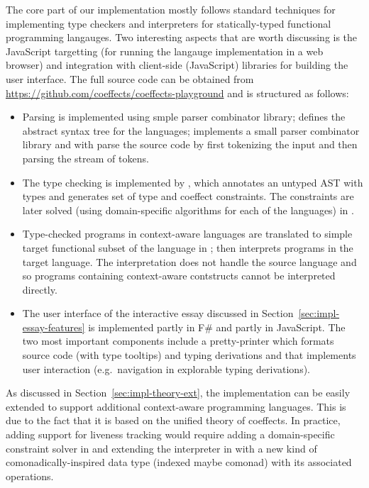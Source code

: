 The core part of our implementation mostly follows standard techniques for implementing type
checkers and interpreters for statically-typed functional programming langauges. Two interesting
aspects that are worth discussing is the JavaScript targetting (for running the langauge
implementation in a web browser) and integration with client-side (JavaScript) libraries for
building the user interface. The full source code can be obtained from
\url{https://github.com/coeffects/coeffects-playground} and is structured as follows:
%
\begin{itemize}
\item Parsing is implemented using smple parser combinator library;  defines the
  abstract syntax tree for the languages;  implements a small parser combinator
  library and  with  parse the source code by first tokenizing
  the input and then parsing the stream of tokens.

\item The type checking is implemented by , which annotates an untyped AST
  with types and generates set of type and coeffect constraints. The constraints are later solved
  (using domain-specific algorithms for each of the languages) in .

\item Type-checked programs in context-aware languages are translated to simple target
  functional subset of the language in ;  then interprets
  programs in the target language. The interpretation does not handle the source
  language and so programs containing context-aware contstructs cannot be interpreted directly.

\item The user interface of the interactive essay discussed in Section~\ref{sec:impl-essay-features}
  is implemented partly in F\# and partly in JavaScript. The two most important components include
  a pretty-printer  which formats source code (with type tooltips) and typing
  derivations and  that implements user interaction (e.g.~navigation in explorable
  typing derivations).
\end{itemize}

\noindent
As discussed in Section~\ref{sec:impl-theory-ext}, the implementation can be easily extended to
support additional context-aware programming languages. This is due to the fact that it is based
on the unified theory of coeffects. In practice, adding support for liveness tracking would
require adding a domain-specific constraint solver in  and extending the
interpreter in  with a new kind of comonadically-inspired data type
(indexed maybe comonad) with its associated operations.

